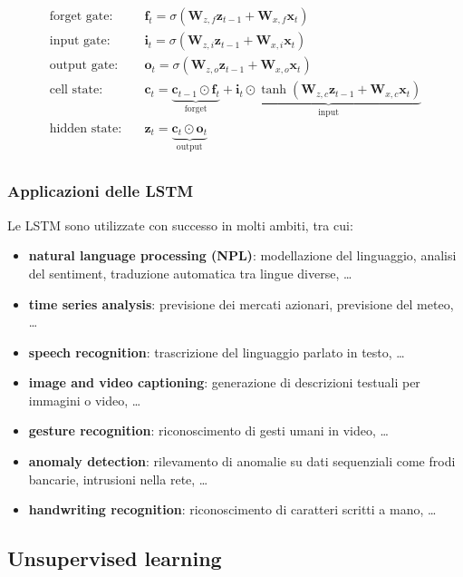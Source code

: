 \begin{align*}
	\text{forget gate}: \quad & \textbf{f}_t = \sigma (\textbf{W}_{z,f} \textbf{z}_{t-1} + \textbf{W}_{x,f} \textbf{x}_t) \\
	\text{input gate}: \quad & \textbf{i}_t = \sigma (\textbf{W}_{z,i} \textbf{z}_{t-1} + \textbf{W}_{x,i} \textbf{x}_t) \\
	\text{output gate}: \quad & \textbf{o}_t = \sigma (\textbf{W}_{z,o} \textbf{z}_{t-1} + \textbf{W}_{x,o} \textbf{x}_t) \\
	\text{cell state}: \quad & \textbf{c}_t = \underbrace{\textbf{c}_{t-1} \odot \textbf{f}_t}_{\text{forget}} + \underbrace{\textbf{i}_t \odot \tanh (\textbf{W}_{z,c} \textbf{z}_{t-1} + \textbf{W}_{x,c} \textbf{x}_t)}_{\text{input}} \\
	\text{hidden state}: \quad & \textbf{z}_t = \underbrace{\textbf{c}_t \odot \textbf{o}_t}_{\text{output}} \\
\end{align*}

\subsubsection*{Applicazioni delle LSTM}
Le LSTM sono utilizzate con successo in molti ambiti, tra cui:
\begin{itemize}
	\item \textbf{natural language processing (NPL)}: modellazione del linguaggio, analisi del sentiment, traduzione automatica
	tra lingue diverse, \dots
	\item \textbf{time series analysis}: previsione dei mercati azionari, previsione del meteo, \dots 
	\item \textbf{speech recognition}: trascrizione del linguaggio parlato in testo, \dots
	\item \textbf{image and video captioning}: generazione di descrizioni testuali per immagini o video, \dots
	\item \textbf{gesture recognition}: riconoscimento di gesti umani in video, \dots
	\item \textbf{anomaly detection}: rilevamento di anomalie su dati sequenziali come frodi bancarie, intrusioni nella rete, \dots
	\item \textbf{handwriting recognition}: riconoscimento di caratteri scritti a mano, \dots
\end{itemize}

\subsection{Unsupervised learning}
